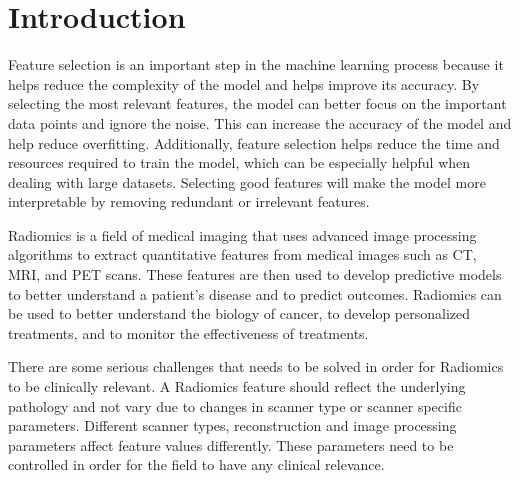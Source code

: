 \section{Introduction}

Feature selection is an important step in the machine learning process because
it helps reduce the complexity of the model and helps improve its accuracy. By
selecting the most relevant features, the model can better focus on the
important data points and ignore the noise. This can increase the accuracy of
the model and help reduce overfitting. Additionally, feature selection helps
reduce the time and resources required to train the model, which can be
especially helpful when dealing with large datasets.
Selecting good features will make the model more interpretable by removing redundant
or irrelevant features. 

Radiomics is a field of medical imaging that uses advanced
image processing algorithms to extract quantitative features from medical
images such as CT, MRI, and PET scans. These features are then used to develop
predictive models to better understand a patient's disease and to predict
outcomes. Radiomics can be used to better understand the biology of cancer, to
develop personalized treatments, and to monitor the effectiveness of
treatments.

There are some serious challenges that needs to be solved in order for
Radiomics to be clinically relevant.     
A Radiomics feature should reflect the underlying pathology and not vary due to
changes in scanner type or scanner specific parameters. Different scanner
types, reconstruction and image processing parameters affect feature values
differently. These parameters need to be controlled in order for the field to have any
clinical relevance. 




